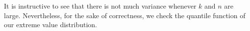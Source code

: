 \documentclass[
  letterpaper,
  DIV=11,
  numbers=noendperiod]{scrartcl}
\begin{document}
It is instructive to see that there is not much variance whenever $k$
and $n$ are large. Nevertheless, for the sake of correctness, we check
the quantile function of our extreme value distribution.

\begin{figure}

\begin{minipage}[t]{0.50\linewidth}

{\centering 


}

\end{minipage}%
%
\begin{minipage}[t]{0.50\linewidth}

{\centering 

}
\end{minipage}
\end{figure}
\end{document}
